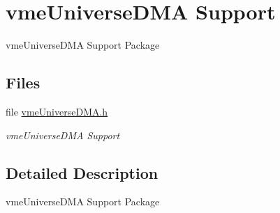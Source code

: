 \hypertarget{group__shared__vmeuniversedma}{}\section{vme\+Universe\+D\+MA Support}
\label{group__shared__vmeuniversedma}


vme\+Universe\+D\+MA Support Package  


\subsection*{Files}
\begin{DoxyCompactItemize}
\item 
file \mbox{\hyperlink{vmeUniverseDMA_8h}{vme\+Universe\+D\+M\+A.\+h}}
\begin{DoxyCompactList}\small\item\em vme\+Universe\+D\+MA Support \end{DoxyCompactList}\end{DoxyCompactItemize}


\subsection{Detailed Description}
vme\+Universe\+D\+MA Support Package 

